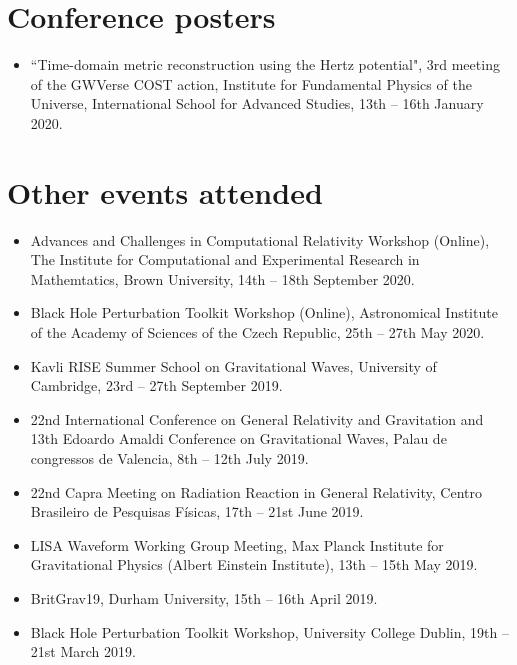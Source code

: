 \documentclass[10.5pt, oneside]{article}   	%
\begin{document}
\section*{Conference posters}
\begin{itemize}
\item ``Time-domain metric reconstruction using the Hertz potential", 3rd meeting of the GWVerse COST action, Institute for Fundamental Physics of the Universe, International School for Advanced Studies, 13th -- 16th January 2020.
\end{itemize} 

 
\section*{Other events attended}
\begin{itemize}
\item Advances and Challenges in Computational Relativity Workshop (Online), The Institute for Computational and Experimental Research in Mathemtatics, Brown University, 14th -- 18th September 2020.
\item Black Hole Perturbation Toolkit Workshop (Online), Astronomical Institute of the Academy of Sciences of the Czech Republic, 25th -- 27th May 2020.
\item Kavli RISE Summer School on Gravitational Waves, University of Cambridge, 23rd -- 27th September 2019.
\item 22nd International Conference on General Relativity and Gravitation and 13th Edoardo Amaldi Conference on Gravitational Waves, Palau de congressos de Valencia, 8th -- 12th July 2019.
\item 22nd Capra Meeting on Radiation Reaction in General Relativity, Centro Brasileiro de Pesquisas Físicas, 17th -- 21st June 2019.
\item LISA Waveform Working Group Meeting, Max Planck Institute for Gravitational Physics (Albert Einstein Institute), 13th -- 15th May 2019.
\item BritGrav19, Durham University, 15th -- 16th April 2019.
\item Black Hole Perturbation Toolkit Workshop, University College Dublin, 19th -- 21st March 2019.
\end{itemize} 
\end{document}
